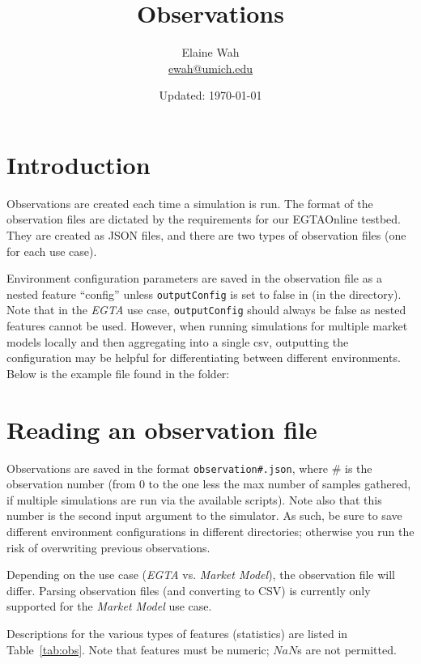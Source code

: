 \documentclass[11pt]{article}
\title{Observations}
\author{
  Elaine Wah\\
  \href{mailto:ewah@umich.edu}{ewah@umich.edu}
}
\date{Updated: \today}
\begin{document}
	
\maketitle

\section{Introduction}

Observations are created each time a simulation is run.
The format of the observation files are dictated by the requirements for our EGTAOnline testbed. They are created as JSON files, and there are two types of observation files (one for each use case).

Environment configuration parameters are saved in the observation file as a nested feature ``config'' unless \verb|outputConfig| is set to false in  (in the  directory).
Note that in the \emph{EGTA} use case, \verb|outputConfig| should always be false as nested features cannot be used. However, when running simulations for multiple market models locally and then aggregating into a single csv, outputting the configuration may be helpful for differentiating between different environments.
%
Below is the example  file found in
the  folder:




\section{Reading an observation file}

Observations are saved in the format \verb|observation#.json|, where \# is the observation number (from 0 to the one less the max number of samples gathered, if multiple simulations are run via the available scripts). Note also that this number is the second input argument to the simulator.
As such, be sure to save different environment configurations in different directories; otherwise you run the risk of overwriting previous observations.

Depending on the use case (\emph{EGTA} vs. \emph{Market Model}), the observation file will differ. Parsing observation files (and converting to CSV) is currently only supported for the \emph{Market Model} use case.

Descriptions for the various types of features (statistics) are listed in Table~\ref{tab:obs}.
%
Note that features must be numeric; $NaN$s are not permitted.
\end{document}

